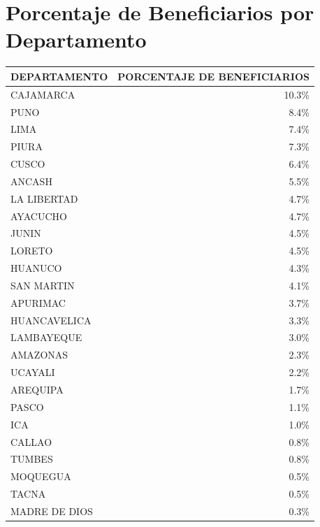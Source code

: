\documentclass[12pt]{article}
\begin{document}
\vspace{1cm}

\section*{Porcentaje de Beneficiarios por Departamento}

\begin{center}
\scriptsize %
\begin{tabular}{|l|r|}
    \hline
    \textbf{DEPARTAMENTO} & \textbf{PORCENTAJE DE BENEFICIARIOS} \\
    \hline
    CAJAMARCA        & 10.3\%                       \\
    PUNO             & 8.4\%                        \\
    LIMA             & 7.4\%                        \\
    PIURA            & 7.3\%                        \\
    CUSCO            & 6.4\%                        \\
    ANCASH           & 5.5\%                        \\
    LA LIBERTAD      & 4.7\%                        \\
    AYACUCHO         & 4.7\%                        \\
    JUNIN            & 4.5\%                        \\
    LORETO           & 4.5\%                        \\
    HUANUCO          & 4.3\%                        \\
    SAN MARTIN       & 4.1\%                        \\
    APURIMAC         & 3.7\%                        \\
    HUANCAVELICA     & 3.3\%                        \\
    LAMBAYEQUE       & 3.0\%                        \\
    AMAZONAS         & 2.3\%                        \\
    UCAYALI          & 2.2\%                        \\
    AREQUIPA         & 1.7\%                        \\
    PASCO            & 1.1\%                        \\
    ICA              & 1.0\%                        \\
    CALLAO           & 0.8\%                        \\
    TUMBES           & 0.8\%                        \\
    MOQUEGUA         & 0.5\%                        \\
    TACNA            & 0.5\%                        \\
    MADRE DE DIOS    & 0.3\%                        \\
    \hline
\end{tabular}
\end{center}
\end{document}
